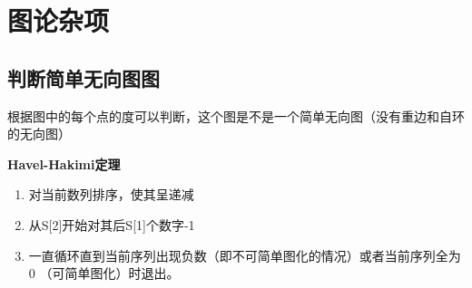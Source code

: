 \section{图论杂项}

\subsection{判断简单无向图图}
根据图中的每个点的度可以判断，这个图是不是一个简单无向图（没有重边和自环的无向图）

\textbf{Havel-Hakimi定理}

\begin{enumerate}
    \item 对当前数列排序，使其呈递减
    \item 从S[2]开始对其后S[1]个数字-1
    \item 一直循环直到当前序列出现负数（即不可简单图化的情况）或者当前序列全为0 （可简单图化）时退出。
\end{enumerate}
